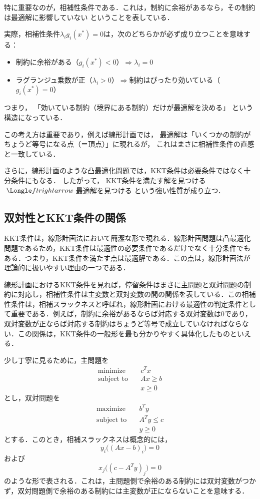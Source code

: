 特に重要なのが，相補性条件である．これは，制約に余裕があるなら，その制約は最適解に影響していない
ということを表している．

実際，相補性条件$\lambda_ig_i(x^*)=0$は，次のどちらかが必ず成り立つことを意味する：

\begin{itemize}
\item 制約に余裕がある（$g_i(x^*)<0$）$\Rightarrow$$\lambda_i=0$
\item ラグランジュ乗数が正（$\lambda_i>0$）$\Rightarrow$制約はぴったり効いている（$g_i(x^*)=0$）
\end{itemize}

つまり，
「効いている制約（境界にある制約）だけが最適解を決める」
という構造になっている．

この考え方は重要であり，例えば線形計画では，
最適解は「いくつかの制約がちょうど等号になる点（＝頂点）」に現れるが，
これはまさに相補性条件の直感と一致している．

さらに，線形計画のような凸最適化問題では，KKT条件は必要条件ではなく十分条件にもなる．
したがって，
KKT条件を満たす解を見つける$\;\Longle ftrightarrow\;$最適解を見つける
という強い性質が成り立つ．

\subsection{双対性とKKT条件の関係}

KKT条件は，線形計画法において簡潔な形で現れる．線形計画問題は凸最適化問題であるため，KKT条件は最適性の必要条件であるだけでなく十分条件でもある．つまり，KKT条件を満たす点は最適解である．この点は，線形計画法が理論的に扱いやすい理由の一つである．

線形計画におけるKKT条件を見れば，停留条件はまさに主問題と双対問題の制約に対応し，相補性条件は主変数と双対変数の間の関係を表している．この相補性条件は，相補スラックネスと呼ばれ，線形計画における最適性の判定条件として重要である．例えば，制約に余裕があるならば対応する双対変数は0であり，双対変数が正ならば対応する制約はちょうど等号で成立していなければならない．この関係は，KKT条件の一般形を最も分かりやすく具体化したものといえる．

少し丁寧に見るために，主問題を
\begin{align}
\text{minimize}\quad&c^Tx\\
\text{subject to}\quad&Ax\ge b\\
&x\ge 0
\end{align}
とし，双対問題を
\begin{align}
\text{maximize}\quad&b^Ty\\
\text{subject to}\quad&A^Ty\le c\\
&y\ge 0
\end{align}
とする．このとき，相補スラックネスは概念的には，
\begin{equation}
y_i\bigl((Ax-b)_i\bigr)=0
\end{equation}
および
\begin{equation}
x_j\bigl((c-A^Ty)_j\bigr)=0
\end{equation}
のような形で表される．これは，主問題側で余裕のある制約には双対変数がつかず，双対問題側で余裕のある制約には主変数が正にならないことを意味する．

